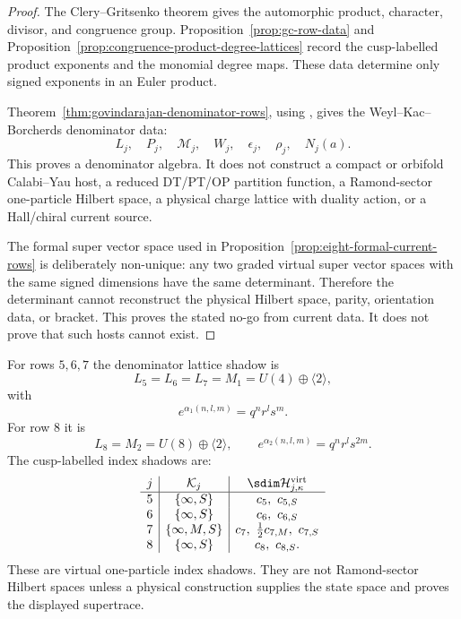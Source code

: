 \begin{proof}
The Clery--Gritsenko theorem \cite{GC} gives the automorphic product,
character, divisor, and congruence group.  Proposition~\ref{prop:gc-row-data}
and Proposition~\ref{prop:congruence-product-degree-lattices} record the
cusp-labelled product exponents and the monomial degree maps.  These data
determine only signed exponents in an Euler product.

Theorem~\ref{thm:govindarajan-denominator-rows}, using
\cite{CD09BKM,GK09CHL,GK10Composite,Gov11BKM}, gives the
Weyl--Kac--Borcherds denominator data:
\[
L_j,\quad P_j,\quad \mathcal M_j,\quad W_j,\quad
\epsilon_j,\quad \rho_j,\quad N_j(a).
\]
This proves a denominator algebra.  It does not construct a compact or
orbifold Calabi--Yau host, a reduced DT/PT/OP partition function, a
Ramond-sector one-particle Hilbert space, a physical charge lattice with
duality action, or a Hall/chiral current source.

The formal super vector space used in Proposition~\ref{prop:eight-formal-current-rows}
is deliberately non-unique: any two graded virtual super vector spaces
with the same signed dimensions have the same determinant.  Therefore
the determinant cannot reconstruct the physical Hilbert space, parity,
orientation data, or bracket.  This proves the stated no-go from current
data.  It does not prove that such hosts cannot exist.
\end{proof}

\begin{definition}
For rows \(5,6,7\) the denominator lattice shadow is
\[
L_5=L_6=L_7=M_1=U(4)\oplus\langle2\rangle,
\]
with
\[
e^{\alpha_1(n,l,m)}=q^nr^ls^m.
\]
For row \(8\) it is
\[
L_8=M_2=U(8)\oplus\langle2\rangle,
\qquad
e^{\alpha_2(n,l,m)}=q^nr^ls^{2m}.
\]
The cusp-labelled index shadows are:
\[
\begin{array}{c|c|c}
j&\mathcal K_j&\sdim\mathcal H_{j,\kappa}^{\mathrm{virt}}\\ \hline
5&\{\infty,S\}&c_5,\ c_{5,S}\\
6&\{\infty,S\}&c_6,\ c_{6,S}\\
7&\{\infty,M,S\}&c_7,\ \frac12c_{7,M},\ c_{7,S}\\
8&\{\infty,S\}&c_8,\ c_{8,S}.
\end{array}
\]
These are virtual one-particle index shadows.  They are not
Ramond-sector Hilbert spaces unless a physical construction supplies the
state space and proves the displayed supertrace.
\end{definition}


